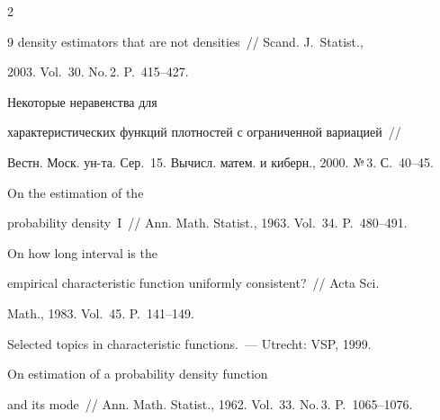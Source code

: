 \begin{multicols}{2}
{{\begin{thebibliography}{9}
density estimators that are not densities~// Scand. J.~Statist.,

2003. Vol.~30. No.\,2. P.~415--427.




 Некоторые неравенства для

характеристических функций плотностей с ограниченной вариацией~//

Вестн. Моск. ун-та. Сер.~15. Вычисл. матем. и киберн., 2000. №\,3. С.~40--45.




 On the estimation of the

probability density~I~//  Ann. Math. Statist., 1963. Vol.~34. P.~480--491.






 On how long interval is the

empirical characteristic function uniformly consistent?~// Acta Sci.

Math., 1983. Vol.~45. P.~141--149.






 Selected topics in characteristic functions.~--- Utrecht: VSP, 1999.



\label{end\stat}




 On estimation of a probability density function

and its mode~// Ann. Math. Statist., 1962. Vol.~33. No.\,3. P.~1065--1076.

 \end{thebibliography}

}

}





\end{multicols}       

